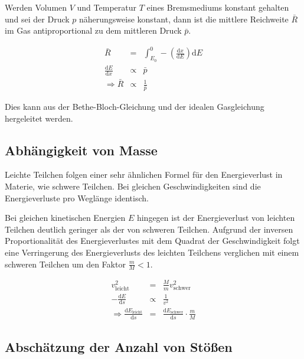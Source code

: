 \documentclass[12pt,a4paper]{scrartcl}
\numberwithin{equation}{section} %
\renewcommand{\[}{} %
\renewcommand{\]}{\noindent} %
\begin{document}
Werden Volumen $V$ und Temperatur $T$ eines Bremsmediums konstant
gehalten und sei der Druck $p$ näherungsweise konstant, dann ist die
mittlere Reichweite $\bar R$ im Gas antiproportional zu dem mittleren
Druck $\bar p$.

\[
\begin{eqnarray}
        \bar{R} &=&
                \int_{E_0}^{0} -\left(\frac{\mathrm dx}{\mathrm dE}\right) \mathrm dE \\
        \frac{\mathrm dE}{\mathrm dx} &\propto& \bar p \\
    \Rightarrow \bar R &\propto& \frac{1}{\bar p}
\end{eqnarray}
\]

Dies kann aus der Bethe-Bloch-Gleichung und der idealen Gasgleichung
hergeleitet werden.

\hypertarget{abhuxe4ngigkeit-von-masse}{%
\subsection{Abhängigkeit von Masse}\label{abhuxe4ngigkeit-von-masse}}

Leichte Teilchen folgen einer sehr ähnlichen Formel für den
Energieverlust in Materie, wie schwere Teilchen. Bei gleichen
Geschwindigkeiten sind die Energieverluste pro Weglänge identisch.

Bei gleichen kinetischen Energien $E$ hingegen ist der Energieverlust
von leichten Teilchen deutlich geringer als der von schweren Teilchen.
Aufgrund der inversen Proportionalität des Energieverlustes mit dem
Quadrat der Geschwindigkeit folgt eine Verringerung des Energieverlusts
des leichten Teilchens verglichen mit einem schweren Teilchen um den
Faktor $\frac{m}{M} < 1$.

\[
\begin{eqnarray}
        v_\mathrm{leicht}^2 & = &\frac{M}{m} v_\mathrm{schwer}^2 \\
        - \frac{\mathrm dE}{\mathrm ds} &\propto& \frac{1}{v^2} \\
        \Rightarrow \frac{\mathrm dE_\mathrm{leicht}}{\mathrm ds}
                &=& \frac{\mathrm dE_\mathrm{schwer}}{\mathrm ds}
                        \cdot \frac{m}{M}
\end{eqnarray}
\]

\hypertarget{abschuxe4tzung-der-anzahl-von-stuxf6uxdfen}{%
\subsection{Abschätzung der Anzahl von
Stößen}\label{abschuxe4tzung-der-anzahl-von-stuxf6uxdfen}}
\end{document}
